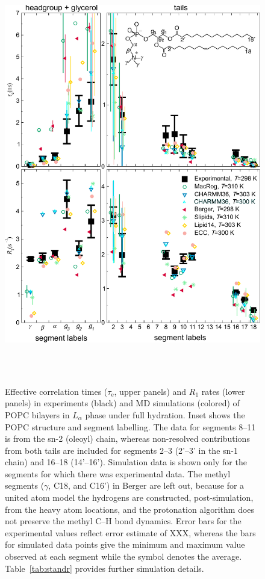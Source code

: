 \documentclass[journal=jpcbfk,manuscript=article,layout=twocolumn]{achemso}
\begin{document}
\begin{figure}[!ht]
\centering
\includegraphics[width=0.9\columnwidth]{normalcond.pdf}
\caption{Effective correlation times ($\tau_\mathrm{e}$, upper panels) and $R_{1}$ rates (lower panels) in experiments (black) and MD simulations (colored) of POPC bilayers in $L_{\alpha}$ phase under full hydration.
Inset shows the POPC structure and segment labelling.
The data for  segments 8--11 is from the sn-2 (oleoyl) chain, whereas non-resolved contributions from both tails are included for segments 2--3 (2'--3' in the sn-1 chain) and 16--18 (14'--16').
Simulation data is shown only for the segments for which there was experimental data.
The methyl segments ($\gamma$, C18, and C16') in Berger are left out, because for a united atom model the hydrogens are constructed, post-simulation, from the heavy atom locations, and the protonation algorithm does not preserve the methyl C--H bond dynamics.
Error bars for the experimental values reflect error estimate of {\color{red}XXX}, whereas the 
bars for simulated data points give the minimum and maximum value observed at each segment while the symbol denotes the average. %
Table~\ref{tab:standr} provides further simulation details.
}
\label{fig:teff_R1}


 \\
 \\


\end{figure}
\end{document}

